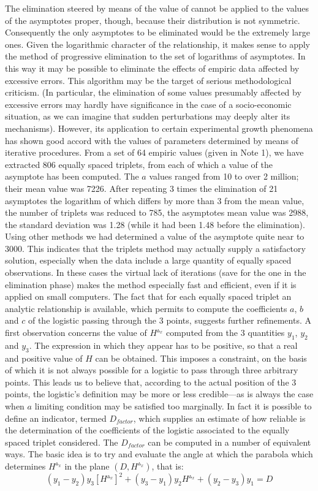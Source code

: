 \documentclass[%
 aip,
 jmp,%
 amsmath,amssymb,
 reprint,%
]{revtex4-1}
\begin{document}
The elimination steered by means of the value of cannot be applied to the values of the asymptotes proper, though, because their distribution is not symmetric. Consequently the only asymptotes to be eliminated would be the extremely large ones.
Given the logarithmic character of  the relationship, it makes sense to apply the method of progressive elimination to the set of logarithms  of asymptotes.
In this way it may be possible to eliminate the effects of empiric data affected by excessive errors.
This algorithm may be the target of serious methodological criticism. (In particular, the elimination of some values  presumably affected by excessive errors may hardly have significance in the case of a socio-economic situation, as  we  can imagine that sudden perturbations may deeply alter its mechanisms).  However, its application to certain experimental growth phenomena has shown good accord with the values of parameters determined by means of iterative procedures.
From a set of 64 empiric values (given in Note 1), we have extracted 806 equally spaced triplets, from each of which a value of the asymptote has been computed. The $a$ values ranged from 10 to over 2 million; their mean value was 7226.
After repeating 3 times the elimination of 21 asymptotes the logarithm of which differs by more than 3 from the mean value, the number of triplets was reduced to 785, the asymptotes mean value was 2988, the standard deviation was 1.28  (while  it had been  1.48 before  the elimination).
Using other methods we had determined a value of  the asymptote quite near to 3000. This indicates that the  triplets method may actually supply a satisfactory solution, especially when the data include a large quantity of equally spaced observations. In these cases the virtual lack of iterations (save for the one in the elimination phase) makes the method especially fast and  efficient, even if it is  applied on  small computers.
The fact that for each equally spaced triplet an analytic  relationship is available, which permits to compute the coefficients $a$, $b$ and $c$ of the logistic passing through the 3 points, suggests further refinements. A first observation concerns  the value of $H^{\vartriangle_x}$ computed  from the 3 quantities $y_1$, $y_2$ and $y_3$. The expression in which they appear has to  be positive, so that a real and positive value of $H$ can be obtained. This imposes a constraint, on the  basis of which it is  not always  possible for a logistic to pass through three arbitrary points.
This leads us to believe that, according to the actual position of the 3 points, the logistic's definition may be more or less credible---as is always the  case when $a$ limiting condition may be satisfied too marginally.
In fact it is possible to define an indicator, termed $D_{factor}$, which supplies an estimate of how reliable is the determination of the coefficients of the logistic  associated to the  equally spaced triplet considered. The $D_{factor}$ can be computed in a number of equivalent ways. The basic idea is to try and evaluate the angle at  which the parabola which determines $H^{\vartriangle_x}$ in the plane $(D, H^{\vartriangle_x})$, that is:
 \[(y_1 - y_2) y_3 [H^{\vartriangle_x}]^2 + (y_3 - y_1) y_2 H^{\vartriangle_x} + (y_2 - y_3) y_1 = D\]
\end{document}
